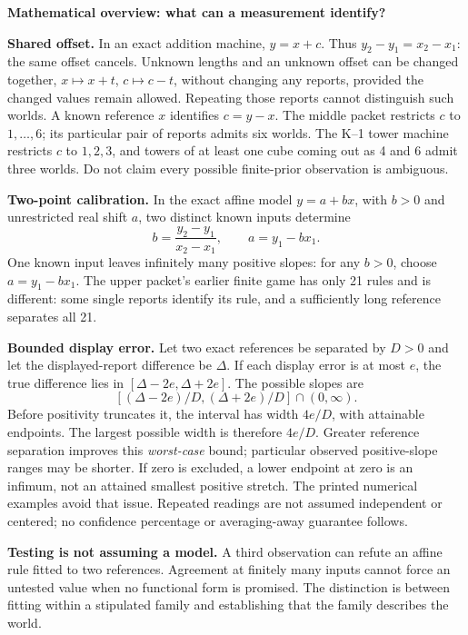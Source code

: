 \documentclass[letterpaper,11pt]{article}
\newcommand{\topic}[1]{\par\medskip\textbf{#1}\par}
\begin{document}
\topic{Mathematical overview: what can a measurement identify?}
\textbf{Shared offset.} In an exact addition machine, $y=x+c$. Thus $y_2-y_1=x_2-x_1$: the same offset cancels. Unknown lengths and an unknown offset can be changed together, $x\mapsto x+t$, $c\mapsto c-t$, without changing any reports, provided the changed values remain allowed. Repeating those reports cannot distinguish such worlds. A known reference $x$ identifies $c=y-x$. The middle packet restricts $c$ to $1,\ldots,6$; its particular pair of reports admits six worlds. The K--1 tower machine restricts $c$ to $1,2,3$, and towers of at least one cube coming out as 4 and 6 admit three worlds. Do not claim every possible finite-prior observation is ambiguous.

\textbf{Two-point calibration.} In the exact affine model $y=a+bx$, with $b>0$ and unrestricted real shift $a$, two distinct known inputs determine
\[
 b=\frac{y_2-y_1}{x_2-x_1},\qquad a=y_1-bx_1.
\]
One known input leaves infinitely many positive slopes: for any $b>0$, choose $a=y_1-bx_1$. The upper packet's earlier finite game has only 21 rules and is different: some single reports identify its rule, and a sufficiently long reference separates all 21.

\textbf{Bounded display error.} Let two exact references be separated by $D>0$ and let the displayed-report difference be $\Delta$. If each display error is at most $e$, the true difference lies in $[\Delta-2e,\Delta+2e]$. The possible slopes are
\[
 [(\Delta-2e)/D,(\Delta+2e)/D]\cap(0,\infty).
\]
Before positivity truncates it, the interval has width $4e/D$, with attainable endpoints. The largest possible width is therefore $4e/D$. Greater reference separation improves this \emph{worst-case} bound; particular observed positive-slope ranges may be shorter. If zero is excluded, a lower endpoint at zero is an infimum, not an attained smallest positive stretch. The printed numerical examples avoid that issue. Repeated readings are not assumed independent or centered; no confidence percentage or averaging-away guarantee follows.

\textbf{Testing is not assuming a model.} A third observation can refute an affine rule fitted to two references. Agreement at finitely many inputs cannot force an untested value when no functional form is promised. The distinction is between fitting within a stipulated family and establishing that the family describes the world.
\end{document}
